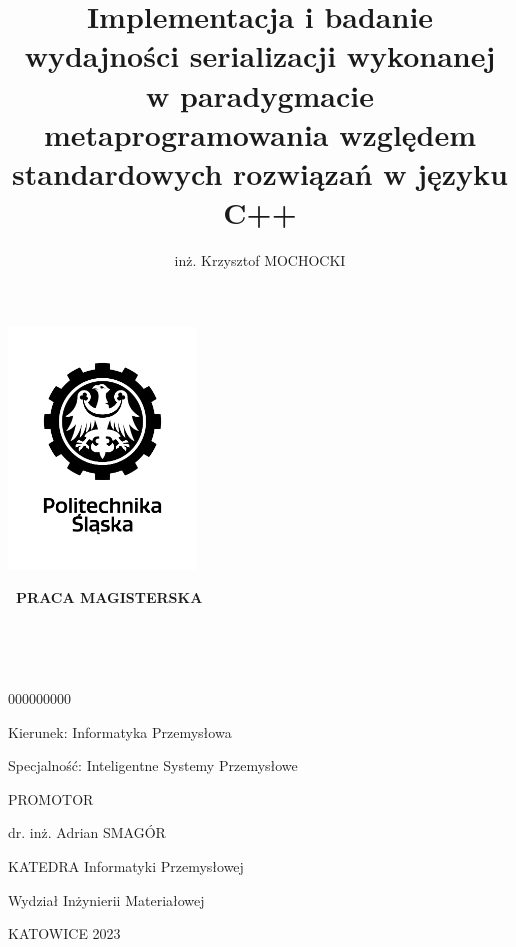 \documentclass[12pt]{article}
\title{Implementacja i badanie wydajności serializacji wykonanej w paradygmacie metaprogramowania względem standardowych rozwiązań w języku C++}
\author{inż. Krzysztof MOCHOCKI}
\date{}
\begin{document}
	\renewcommand*\listfigurename{}
	\renewcommand*\listoftables{}

	\begin{titlepage}
		\clearpage
		\centering

		\includegraphics[width=5cm, keepaspectratio=true]{./img/black_and_white_polsl_logo.png}

		{\LARGE\bfseries\ PRACA MAGISTERSKA}

		\vspace*{1cm}

		{\LARGE \MyTitle}

		\Large\bfseries\

		\begin{spacing}{1.125}
			\MyAuthor\

			000000000
			\vspace*{1cm}

			Kierunek: Informatyka Przemysłowa

			Specjalność: Inteligentne Systemy Przemysłowe

			\vspace*{1cm}

			PROMOTOR

			dr. inż. Adrian SMAGÓR

			\vspace*{0.5cm}

			KATEDRA Informatyki Przemysłowej

			Wydział Inżynierii Materiałowej

			\vspace*{\vfill}

			KATOWICE 2023
		\end{spacing}

		\thispagestyle{empty}
	\end{titlepage}
\end{document}
